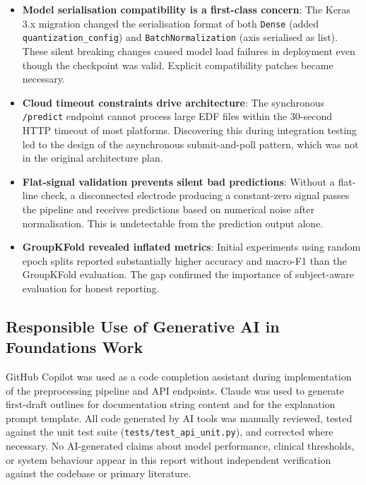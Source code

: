 \documentclass[10pt]{article}
\begin{document}
\begin{itemize}
  \item \textbf{Model serialisation compatibility is a first-class concern}: The Keras 3.x migration changed the serialisation format of both \texttt{Dense} (added \texttt{quantization\_config}) and \texttt{BatchNormalization} (axis serialised as list). These silent breaking changes caused model load failures in deployment even though the checkpoint was valid. Explicit compatibility patches became necessary.
  \item \textbf{Cloud timeout constraints drive architecture}: The synchronous \texttt{/predict} endpoint cannot process large EDF files within the 30-second HTTP timeout of most platforms. Discovering this during integration testing led to the design of the asynchronous submit-and-poll pattern, which was not in the original architecture plan.
  \item \textbf{Flat-signal validation prevents silent bad predictions}: Without a flat-line check, a disconnected electrode producing a constant-zero signal passes the pipeline and receives predictions based on numerical noise after normalisation. This is undetectable from the prediction output alone.
  \item \textbf{GroupKFold revealed inflated metrics}: Initial experiments using random epoch splits reported substantially higher accuracy and macro-F1 than the GroupKFold evaluation. The gap confirmed the importance of subject-aware evaluation for honest reporting.
\end{itemize}

\subsection{Responsible Use of Generative AI in Foundations Work}
\label{sec:aiDisclosure}

GitHub Copilot was used as a code completion assistant during implementation of the preprocessing pipeline and API endpoints. Claude was used to generate first-draft outlines for documentation string content and for the explanation prompt template. All code generated by AI tools was manually reviewed, tested against the unit test suite (\texttt{tests/test\_api\_unit.py}), and corrected where necessary. No AI-generated claims about model performance, clinical thresholds, or system behaviour appear in this report without independent verification against the codebase or primary literature.
\end{document}
